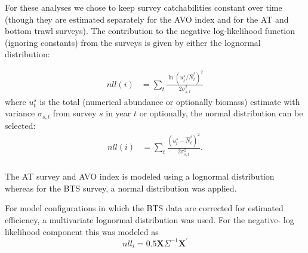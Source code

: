 \documentclass[11pt,
  english,
  a4paper,
]{article}
\begin{document}
\leavevmode\tagmcend\tagstructend\par


For these analyses we chose to keep survey catchabilities constant over time (though they are estimated separately for the AVO index and for the AT and bottom trawl surveys). The contribution to the negative log-likelihood function (ignoring constants) from the surveys is given by either the lognormal distribution:

\leavevmode\tagmcend\tagstructend\par


\begin{align}
nll(i) &= \sum_t{\frac{\ln(u_t^s/\hat N_t^s)^2}{2\sigma_{s,t}^2}}
\end{align} where {\(u_t^s\)\leavevmode\tagmcend\tagstructend} is the total (numerical abundance or optionally biomass) estimate with variance {\(\sigma_{s,t}\)\leavevmode\tagmcend\tagstructend} from survey {\(s\)\leavevmode\tagmcend\tagstructend} in year {\(t\)\leavevmode\tagmcend\tagstructend} or optionally, the normal distribution can be selected: \begin{align}
nll(i) &= \sum_t{\frac{(u_t^s - \hat N_t^s)^2}{2\sigma_{s,t}^2}}. \\
\end{align}

\leavevmode\tagmcend\tagstructend\par


The AT survey and AVO index is modeled using a lognormal distribution whereas for the BTS survey, a normal distribution was applied.

\leavevmode\tagmcend\tagstructend\par


For model configurations in which the BTS data are corrected for estimated efficiency, a multivariate lognormal distribution was used. For the negative- log likelihood component this was modeled as \begin{equation}
nll_i = 0.5\mathbf{X}\Sigma^{-1}\mathbf{X}^{'}
\end{equation}
\end{document}
